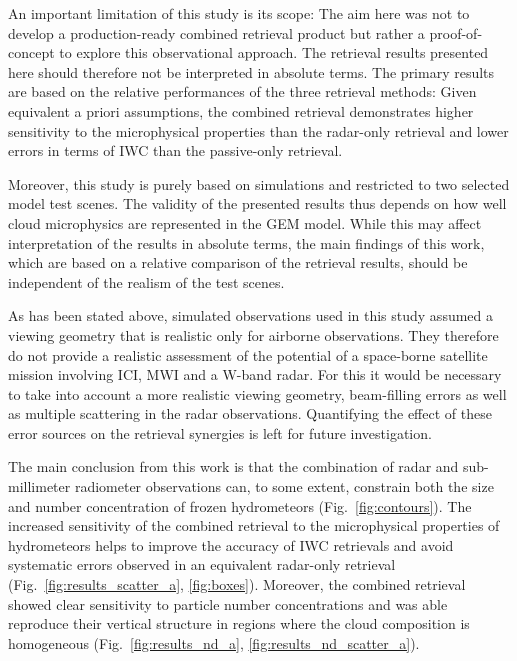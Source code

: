 \documentclass[journal abbreviation, manuscript]{copernicus}
\begin{document}
An important limitation of this study is its scope: The aim here was not to
develop a production-ready combined retrieval product but rather a
proof-of-concept to explore this observational approach. The retrieval results
presented here should therefore not be interpreted in absolute terms. The
primary results are based on the relative performances of the three retrieval
methods: Given equivalent a priori assumptions, the combined retrieval
demonstrates higher sensitivity to the microphysical properties than the
radar-only retrieval and lower errors in terms of IWC than the passive-only
retrieval.

Moreover, this study is purely based on simulations and restricted to two
selected model test scenes. The validity of the presented results thus depends
on how well cloud microphysics are represented in the GEM model. While this may
affect interpretation of the results in absolute terms, the main findings of
this work, which are based on a relative comparison of the retrieval results,
should be independent of the realism of the test scenes.

As has been stated above, simulated observations used in this study assumed a
viewing geometry that is realistic only for airborne observations. They
therefore do not provide a realistic assessment of the potential of a
space-borne satellite mission involving ICI, MWI and a W-band radar. For this it
would be necessary to take into account a more realistic viewing geometry,
beam-filling errors as well as multiple scattering in the radar observations.
Quantifying the effect of these error sources on the retrieval synergies is
left for future investigation.

\conclusions  %
\label{sec:conclusions}

The main conclusion from this work is that the combination of radar and
sub-millimeter radiometer observations can, to some extent, constrain both the
size and number concentration of frozen hydrometeors (Fig.~\ref{fig:contours}).
The increased sensitivity of the combined retrieval to the microphysical
properties of hydrometeors helps to improve the accuracy of IWC retrievals and
avoid systematic errors observed in an equivalent radar-only retrieval
(Fig.~\ref{fig:results_scatter_a}, \ref{fig:boxes}). Moreover, the combined
retrieval showed clear sensitivity to particle number concentrations and was
able reproduce their vertical structure in regions where the cloud composition
is homogeneous (Fig.~\ref{fig:results_nd_a}, \ref{fig:results_nd_scatter_a}).
\end{document}
